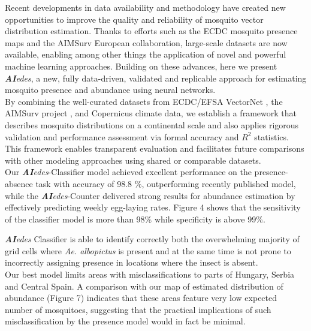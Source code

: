 \documentclass[preprint,12pt]{elsarticle}
\begin{document}
Recent developments in data availability and methodology have created new opportunities to improve the quality and reliability of mosquito vector distribution estimation. Thanks to efforts such as the ECDC mosquito presence maps and the AIMSurv European collaboration, large-scale datasets are now available, enabling among other things the application of novel and powerful machine learning approaches. Building on these advances, here we present \textit{\textbf{AI}edes}, a new, fully data-driven, validated and replicable approach for estimating mosquito presence and abundance using neural networks.\\

By combining the well-curated datasets from ECDC/EFSA VectorNet \cite{ecdc2024a}, the AIMSurv project \cite{miranda2022aimsurv}, and Copernicus climate data, we establish a framework that describes mosquito distributions on a continental scale and also applies rigorous validation and performance assessment via formal accuracy and $R^2$ statistics. This framework enables transparent evaluation and facilitates future comparisons with other modeling approaches using shared or comparable datasets.\\

Our \textit{\textbf{AI}edes}-Classifier model achieved excellent performance on the presence-absence task with accuracy of 98.8 \%, outperforming recently published model\cite{zardini2024}, while the \textit{\textbf{AI}edes}-Counter delivered strong results for abundance estimation by effectively predicting weekly egg-laying rates. Figure 4 shows that the sensitivity of the classifier model is more than 98\% while specificity is above 99\%. 

\textit{\textbf{AI}edes} Classifier is able to identify correctly both the overwhelming majority of grid cells where \emph{Ae. albopictus} is present and at the same time is not prone to incorrectly assigning presence in locations where the insect is absent.\\

Our best model limits areas with misclassifications to parts of Hungary, Serbia and Central Spain. A comparison with our map of estimated distribution of abundance (Figure 7) indicates that these areas feature very low expected number of mosquitoes, suggesting that the practical implications of such misclassification by the presence model would in fact be minimal.
\\
\end{document}
